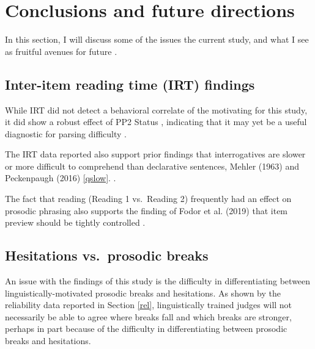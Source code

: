 \documentclass[12pt,oneside]{book}
\begin{document}
\hypertarget{confound}{%
\section{Conclusions and future directions}\label{confound}}

In this section, I will discuss some of the  issues  the current study, and what I see as fruitful avenues for future .

\hypertarget{inter-item-reading-time-irt-findings}{%
\subsection{Inter-item reading time (IRT) findings}\label{inter-item-reading-time-irt-findings}}


While IRT did not detect a behavioral correlate of the motivating  for this study, it did show a robust effect of PP2 Status , indicating that it may yet be a useful diagnostic for parsing difficulty .

The IRT data reported also support prior findings that interrogatives are  slower  or more difficult to comprehend than  declarative sentences,  Mehler (1963) and Peckenpaugh (2016)  \ref{qslow}. .

The fact that reading (Reading 1 vs.~Reading 2) frequently had an effect on prosodic phrasing also supports the finding of Fodor et al. (2019) that  item preview should be tightly controlled .

\hypertarget{hesitations-vs.-prosodic-breaks}{%
\subsection{Hesitations vs.~prosodic breaks}\label{hesitations-vs.-prosodic-breaks}}

An issue with the findings of this study is the difficulty in differentiating between linguistically-motivated prosodic breaks and hesitations. As shown by the reliability data reported in Section \ref{rel}, linguistically trained judges will not necessarily be able to agree where breaks fall and which breaks are stronger, perhaps in part because of the difficulty in differentiating between prosodic breaks and hesitations.
\end{document}
